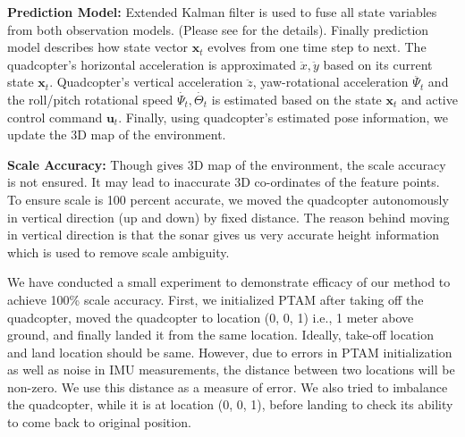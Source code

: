 \textbf{Prediction Model:} Extended Kalman filter is used to fuse all state
variables from both observation models. (Please see \cite{engel} for the
details). Finally prediction model describes how state vector $\mathbf{x}_t$
evolves from one time step to next. The quadcopter’s horizontal acceleration is
approximated $\ddot{x}, \ddot{y}$ based on its current state $\mathbf{x}_t$.
Quadcopter's vertical acceleration   $\ddot{z}$, yaw-rotational 
acceleration $\ddot{{\Psi}_t}$ and the roll/pitch rotational speed
$\dot{{\Psi}_t}, \dot{{\Theta}_t}$ is estimated based on the state
$\mathbf{x}_t$ and  active control command $\mathbf{u}_t$. Finally, using quadcopter's 
estimated pose information, we update the 3D map of the environment.

\noindent\textbf{Scale Accuracy:} 
Though \cite{engel}  gives 3D map of the environment, the scale accuracy is not
ensured. It may lead to inaccurate 3D co-ordinates of the feature points. To
ensure scale is 100 percent accurate, we moved the quadcopter autonomously in
vertical direction (up and down) by fixed distance. The reason behind moving in
vertical direction is that the sonar gives us very accurate height information 
which is used to remove scale ambiguity.

We have conducted a small experiment to demonstrate efficacy of our method to
achieve 100\% scale accuracy. First, we initialized PTAM after
taking off the quadcopter, moved the quadcopter to location (0, 0, 1) i.e., 1
meter above ground, and finally landed it from the same location. Ideally,
take-off location and land location should be same. However, due to errors in
PTAM initialization as well as noise in IMU measurements, the distance between
two locations will be non-zero. We use this distance as a measure of error. We also tried to imbalance the quadcopter, while it is at location (0, 0, 1), before landing to check its
ability to come back to original position.

